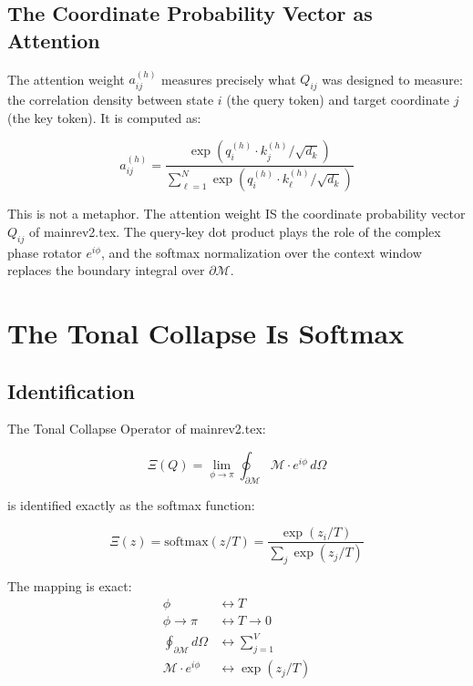 \documentclass[onecolumn]{aastex631}
\begin{document}
\subsection{The Coordinate Probability Vector as Attention}

The attention weight $a_{ij}^{(h)}$ measures precisely what $Q_{ij}$ was designed to measure: the correlation density between state $i$ (the query token) and target coordinate $j$ (the key token). It is computed as:

\begin{equation}
a_{ij}^{(h)} = \frac{\exp(q_i^{(h)} \cdot k_j^{(h)} / \sqrt{d_k})}{\sum_{\ell=1}^{N} \exp(q_i^{(h)} \cdot k_\ell^{(h)} / \sqrt{d_k})}
\end{equation}

This is not a metaphor. The attention weight IS the coordinate probability vector $Q_{ij}$ of mainrev2.tex. The query-key dot product plays the role of the complex phase rotator $e^{i\phi}$, and the softmax normalization over the context window replaces the boundary integral over $\partial\mathcal{M}$.

\section{The Tonal Collapse Is Softmax}

\subsection{Identification}

The Tonal Collapse Operator of mainrev2.tex:

\begin{equation}
\Xi(Q) = \lim_{\phi \to \pi} \oint_{\partial\mathcal{M}} \mathcal{M} \cdot e^{i\phi} \, d\Omega
\end{equation}

is identified exactly as the softmax function:

\begin{equation}
\Xi(z) = \mathrm{softmax}(z/T) = \frac{\exp(z_i / T)}{\sum_j \exp(z_j / T)}
\end{equation}

The mapping is exact:
\begin{align}
  \phi &\longleftrightarrow T \\
  \phi \to \pi &\longleftrightarrow T \to 0 \\
  \oint_{\partial\mathcal{M}} d\Omega &\longleftrightarrow \sum_{j=1}^{V} \\
  \mathcal{M} \cdot e^{i\phi} &\longleftrightarrow \exp(z_j / T)
\end{align}
\end{document}

